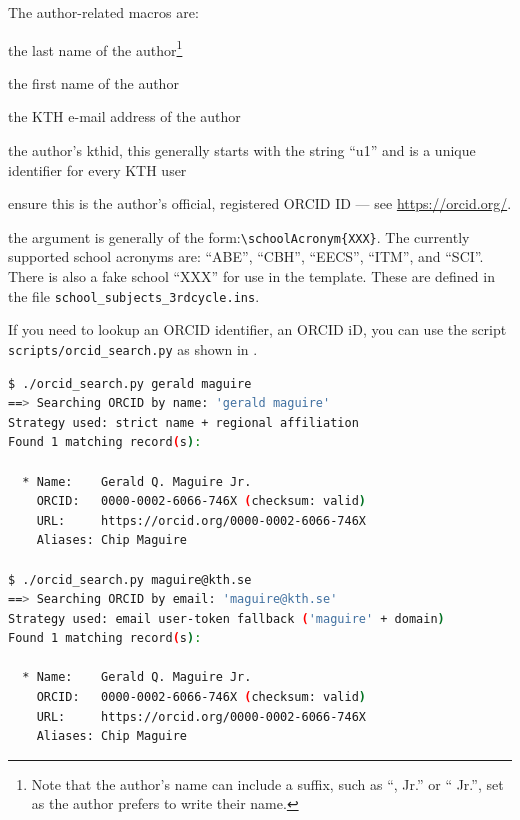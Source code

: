 \documentclass[12pt, twoside]{article}
\newcommand{\fname}[1]{\texttt{#1}}
\begin{document}
The author-related macros are:
\begin{description}[style=nextline, leftmargin=!, labelwidth =\widthof{\texttt{\textbackslash authorsFirstname\{\}}}]
\item [\texttt{\textbackslash authorsLastname\{\}}] the last name of the author\footnote{Note that the author's name can include a suffix, such as \enquote{, Jr.} or \enquote{ Jr.},  set as the author prefers to write their name.}

\item [\texttt{\textbackslash authorsFirstname\{\}}] the first name of the author

\item [\texttt{\textbackslash email\{\}}] the \gls{KTH} e-mail address of the author

\item [\texttt{\textbackslash kthid\{\}}] the author's kthid, this generally starts with the string \enquote{u1} and is a unique identifier for every \gls{KTH} user

\item [\texttt{\textbackslash orcid\{\}}] ensure this is the author's official, registered \gls{ORCID} ID --- see \url{https://orcid.org/}.

\item [\texttt{\textbackslash authorsSchool\{\}}] the argument is generally of the form:\linebreak[4] \texttt{\textbackslash schoolAcronym\{XXX\}}. The currently supported school acronyms are: \enquote{ABE}, \enquote{CBH}, \enquote{EECS}, \enquote{ITM}, and \enquote{SCI}. There is also a fake school \enquote{XXX} for use in the template. These are defined in the file \fname{school\_subjects\_3rdcycle.ins}.
\end{description}

If you need to lookup an \gls{ORCID} identifier, \ie an ORCID iD, you can use the script \fname{scripts/orcid\_search.py} as shown in .

\begin{lstlisting}[language={bash}, caption={Search for an ORCID iD},label=lst:bashOrcidSearch]
$ ./orcid_search.py gerald maguire
==> Searching ORCID by name: 'gerald maguire'
Strategy used: strict name + regional affiliation
Found 1 matching record(s):

  * Name:    Gerald Q. Maguire Jr.
    ORCID:   0000-0002-6066-746X (checksum: valid)
    URL:     https://orcid.org/0000-0002-6066-746X
    Aliases: Chip Maguire

$ ./orcid_search.py maguire@kth.se
==> Searching ORCID by email: 'maguire@kth.se'
Strategy used: email user-token fallback ('maguire' + domain)
Found 1 matching record(s):

  * Name:    Gerald Q. Maguire Jr.
    ORCID:   0000-0002-6066-746X (checksum: valid)
    URL:     https://orcid.org/0000-0002-6066-746X
    Aliases: Chip Maguire
\end{lstlisting}
\end{document}
